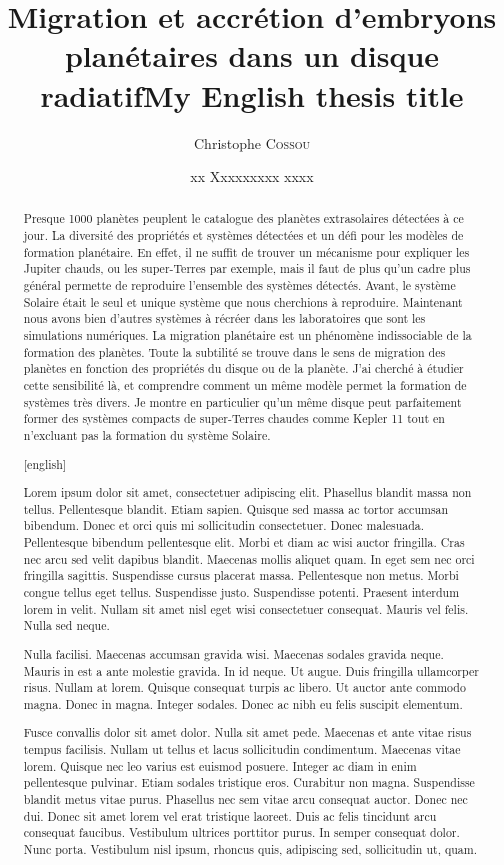 \documentclass[logos,chaptertoc]{bordeaux-thesis}
\author{Christophe \textsc{Cossou}}
\title{Migration et accrétion d'embryons planétaires dans un disque radiatif}
\title[english]{My English thesis title}
\date{xx Xxxxxxxxx xxxx}
\newcommand{\object}[1]{#1}
\newcommand{\dummytext}{
Lorem ipsum dolor sit amet, consectetuer adipiscing elit. Phasellus blandit massa non tellus. Pellentesque blandit. Etiam sapien. Quisque sed massa ac tortor accumsan bibendum. Donec et orci quis mi sollicitudin consectetuer. Donec malesuada. Pellentesque bibendum pellentesque elit. Morbi et diam ac wisi auctor fringilla. Cras nec arcu sed velit dapibus blandit. Maecenas mollis aliquet quam. In eget sem nec orci fringilla sagittis. Suspendisse cursus placerat massa. Pellentesque non metus. Morbi congue tellus eget tellus. Suspendisse justo. Suspendisse potenti. Praesent interdum lorem in velit. Nullam sit amet nisl eget wisi consectetuer consequat. Mauris vel felis. Nulla sed neque.

Nulla facilisi. Maecenas accumsan gravida wisi. Maecenas sodales gravida neque. Mauris in est a ante molestie gravida. In id neque. Ut augue. Duis fringilla ullamcorper risus. Nullam at lorem. Quisque consequat turpis ac libero. Ut auctor ante commodo magna. Donec in magna. Integer sodales. Donec ac nibh eu felis suscipit elementum.

Fusce convallis dolor sit amet dolor. Nulla sit amet pede. Maecenas et ante vitae risus tempus facilisis. Nullam ut tellus et lacus sollicitudin condimentum. Maecenas vitae lorem. Quisque nec leo varius est euismod posuere. Integer ac diam in enim pellentesque pulvinar. Etiam sodales tristique eros. Curabitur non magna. Suspendisse blandit metus vitae purus. Phasellus nec sem vitae arcu consequat auctor. Donec nec dui. Donec sit amet lorem vel erat tristique laoreet. Duis ac felis tincidunt arcu consequat faucibus. Vestibulum ultrices porttitor purus. In semper consequat dolor. Nunc porta. Vestibulum nisl ipsum, rhoncus quis, adipiscing sed, sollicitudin ut, quam.
}
\begin{document}
\maketitle%

\pagestyle{empty}


\begin{abstract}
Presque 1000 planètes peuplent le catalogue des planètes extrasolaires détectées à ce jour. La diversité des propriétés et systèmes détectées et un défi pour les modèles de formation planétaire. En effet, il ne suffit de trouver un mécanisme pour expliquer les Jupiter chauds, ou les super-Terres par exemple, mais il faut de plus qu'un cadre plus général permette de reproduire l'ensemble des systèmes détectés. Avant, le système Solaire était le seul et unique système que nous cherchions à reproduire. Maintenant nous avons bien d'autres systèmes à récréer dans les laboratoires que sont les simulations numériques. La migration planétaire est un phénomène indissociable de la formation des planètes. Toute la subtilité se trouve dans le sens de migration des planètes en fonction des propriétés du disque ou de la planète. J'ai cherché à étudier cette sensibilité là, et comprendre comment un même modèle permet la formation de systèmes très divers. Je montre en particulier qu'un même disque peut parfaitement former des systèmes compacts de super-Terres chaudes comme \object{Kepler 11} tout en n'excluant pas la formation du système Solaire.
\end{abstract}

\noindent\hspace*{0.35\textwidth}\hrulefill\hspace*{0.35\textwidth}\\[-\bigskipamount]

\begin{abstract}[english]
\dummytext
\end{abstract}


\pagebreak\strut\newpage
\end{document}
